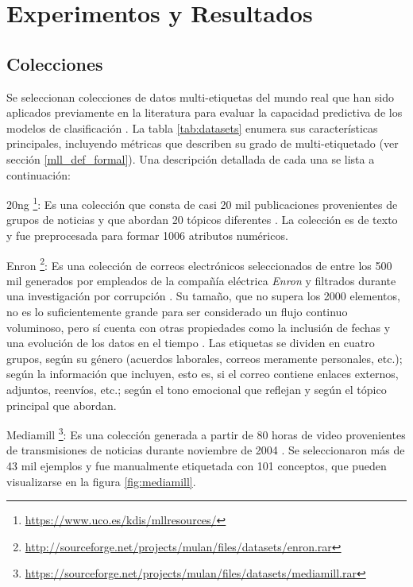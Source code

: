 \chapter{Experimentos y Resultados}

\section{Colecciones}


Se seleccionan colecciones de datos multi-etiquetas del mundo real que han sido
aplicados previamente en la literatura para evaluar la capacidad predictiva de
los modelos de clasificación \cite{osojnik_multi-label_2017, read_scalable_2012,
	buyukcakir_novel_2018}. La tabla \ref{tab:datasets} enumera sus características
principales, incluyendo métricas que describen su grado de multi-etiquetado (ver
sección \ref{mll_def_formal}). Una descripción detallada de cada una se lista a
continuación:

\begin{description}

	\item{20ng} \footnote{\url{https://www.uco.es/kdis/mllresources/}}: Es una
	      colección que consta de casi 20 mil publicaciones provenientes de grupos de
	      noticias y que abordan 20 tópicos diferentes \cite{lang_newsweeder_1995}.
	      La colección es de texto y fue preprocesada para formar 1006 atributos
	      numéricos.

	\item{Enron}
	      \footnote{\url{http://sourceforge.net/projects/mulan/files/datasets/enron.rar}}:
	      Es una colección de correos electrónicos seleccionados de entre los 500 mil
	      generados por empleados de la compañía eléctrica \textit{Enron} y filtrados
	      durante una investigación por corrupción \cite{hutchison_enron_2004}. Su
	      tamaño, que no supera los 2000 elementos, no es lo suficientemente grande
	      para ser considerado un flujo continuo voluminoso, pero sí cuenta con otras
	      propiedades como la inclusión de fechas y una evolución de los datos en el
	      tiempo \cite{read_scalable_2012}. Las etiquetas se dividen en cuatro
	      grupos, según su género (acuerdos laborales, correos meramente personales,
	      etc.); según la información que incluyen, esto es, si el correo contiene
	      enlaces externos, adjuntos, reenvíos, etc.; según el tono emocional que
	      reflejan y según el tópico principal que abordan.

	\item{Mediamill}
	      \footnote{\url{https://sourceforge.net/projects/mulan/files/datasets/mediamill.rar}}:
	      Es una colección generada a partir de 80 horas de video provenientes de
	      transmisiones de noticias durante noviembre de 2004
	      \cite{snoek_challenge_2006}. Se seleccionaron más de 43 mil ejemplos y fue
	      manualmente etiquetada con 101 conceptos, que pueden visualizarse en la
	      figura \ref{fig:mediamill}.

\end{description}

